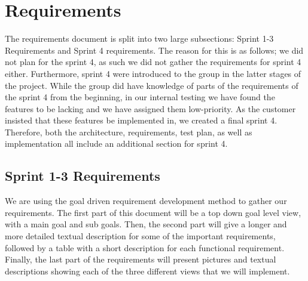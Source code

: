 \documentclass[../document]{subfiles}
\begin{document}
\section{Requirements}
\label{requirements}

The requirements document is split into two large subsections: Sprint 1-3 Requirements and Sprint 4 requirements. The reason for this is as follows; we did not plan for the sprint 4, as such we did not gather the requirements for sprint 4 either. Furthermore, sprint 4 were introduced to the group in the latter stages of the project. While the group did have knowledge of parts of the requirements of the sprint 4 from the beginning, in our internal testing we have found the features to be lacking and we have assigned them low-priority. As the customer insisted that these features be implemented in, we created a final sprint 4. Therefore, both the architecture, requirements, test plan, as well as implementation all include an additional section for sprint 4.

\subsection{Sprint 1-3 Requirements}

We are using the goal driven requirement development method to gather our requirements. The first part of this document will be a top down goal level view, with a main goal and sub goals. Then, the second part will give a longer and more detailed textual description for some of the important requirements, followed by a table with a short description for each functional requirement. Finally, the last part of the requirements will present pictures and textual descriptions showing each of the three different views that we will implement.
\end{document}
